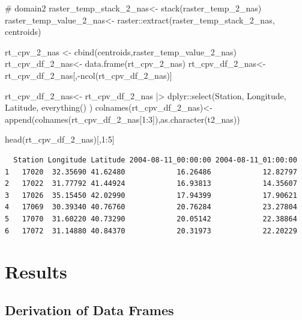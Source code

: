 \documentclass[
  letterpaper,
  DIV=11,
  numbers=noendperiod,
  abstract]{scrartcl}
\newenvironment{Shaded}{\begin{snugshade}}{\end{snugshade}}
\newcommand{\CommentTok}[1]{\textcolor[rgb]{0.37,0.37,0.37}{#1}}
\newcommand{\DecValTok}[1]{\textcolor[rgb]{0.68,0.00,0.00}{#1}}
\newcommand{\FunctionTok}[1]{\textcolor[rgb]{0.28,0.35,0.67}{#1}}
\newcommand{\NormalTok}[1]{\textcolor[rgb]{0.00,0.23,0.31}{#1}}
\newcommand{\OtherTok}[1]{\textcolor[rgb]{0.00,0.23,0.31}{#1}}
\newcommand{\SpecialCharTok}[1]{\textcolor[rgb]{0.37,0.37,0.37}{#1}}
\begin{document}
\begin{Shaded}
\begin{Highlighting}[]
\CommentTok{\# domain2}
\NormalTok{raster\_temp\_stack\_2\_nas}\OtherTok{\textless{}{-}} \FunctionTok{stack}\NormalTok{(raster\_temp\_2\_nas)}
\NormalTok{raster\_temp\_value\_2\_nas}\OtherTok{\textless{}{-}}\NormalTok{ raster}\SpecialCharTok{::}\FunctionTok{extract}\NormalTok{(raster\_temp\_stack\_2\_nas, centroids)}

\NormalTok{rt\_cpv\_2\_nas }\OtherTok{\textless{}{-}} \FunctionTok{cbind}\NormalTok{(centroids,raster\_temp\_value\_2\_nas)}
\NormalTok{rt\_cpv\_df\_2\_nas}\OtherTok{\textless{}{-}} \FunctionTok{data.frame}\NormalTok{(rt\_cpv\_2\_nas) }
\NormalTok{rt\_cpv\_df\_2\_nas}\OtherTok{\textless{}{-}}\NormalTok{ rt\_cpv\_df\_2\_nas[,}\SpecialCharTok{{-}}\FunctionTok{ncol}\NormalTok{(rt\_cpv\_df\_2\_nas)]}

\NormalTok{rt\_cpv\_df\_2\_nas}\OtherTok{\textless{}{-}} 
\NormalTok{  rt\_cpv\_df\_2\_nas }\SpecialCharTok{|\textgreater{}} 
\NormalTok{  dplyr}\SpecialCharTok{::}\FunctionTok{select}\NormalTok{(Station, Longitude, Latitude,  }\FunctionTok{everything}\NormalTok{() )}
\FunctionTok{colnames}\NormalTok{(rt\_cpv\_df\_2\_nas)}\OtherTok{\textless{}{-}} \FunctionTok{append}\NormalTok{(}\FunctionTok{colnames}\NormalTok{(rt\_cpv\_df\_2\_nas[}\DecValTok{1}\SpecialCharTok{:}\DecValTok{3}\NormalTok{]),}\FunctionTok{as.character}\NormalTok{(t2\_nas))}

\FunctionTok{head}\NormalTok{(rt\_cpv\_df\_2\_nas)[,}\DecValTok{1}\SpecialCharTok{:}\DecValTok{5}\NormalTok{]}
\end{Highlighting}
\end{Shaded}

\begin{verbatim}
  Station Longitude Latitude 2004-08-11_00:00:00 2004-08-11_01:00:00
1   17020  32.35690 41.62480            16.26486            12.82797
2   17022  31.77792 41.44924            16.93813            14.35607
3   17026  35.15450 42.02990            17.94399            17.90621
4   17069  30.39340 40.76760            20.76284            23.27804
5   17070  31.60220 40.73290            20.05142            22.38864
6   17072  31.14880 40.84370            20.31973            22.20229
\end{verbatim}

\hypertarget{results}{%
\section{Results}\label{results}}

\hypertarget{derivation-of-data-frames}{%
\subsection{Derivation of Data Frames}\label{derivation-of-data-frames}}
\end{document}
